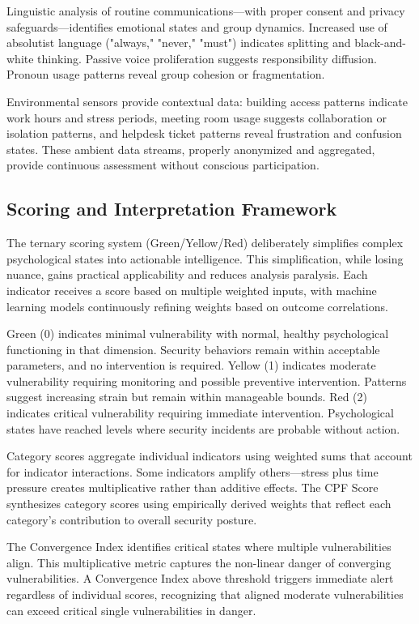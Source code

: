 \documentclass[11pt,a4paper]{article}
\begin{document}
Linguistic analysis of routine communications—with proper consent and privacy safeguards—identifies emotional states and group dynamics. Increased use of absolutist language ("always," "never," "must") indicates splitting and black-and-white thinking. Passive voice proliferation suggests responsibility diffusion. Pronoun usage patterns reveal group cohesion or fragmentation.

Environmental sensors provide contextual data: building access patterns indicate work hours and stress periods, meeting room usage suggests collaboration or isolation patterns, and helpdesk ticket patterns reveal frustration and confusion states. These ambient data streams, properly anonymized and aggregated, provide continuous assessment without conscious participation.

\subsection{Scoring and Interpretation Framework}

The ternary scoring system (Green/Yellow/Red) deliberately simplifies complex psychological states into actionable intelligence. This simplification, while losing nuance, gains practical applicability and reduces analysis paralysis. Each indicator receives a score based on multiple weighted inputs, with machine learning models continuously refining weights based on outcome correlations.

Green (0) indicates minimal vulnerability with normal, healthy psychological functioning in that dimension. Security behaviors remain within acceptable parameters, and no intervention is required. Yellow (1) indicates moderate vulnerability requiring monitoring and possible preventive intervention. Patterns suggest increasing strain but remain within manageable bounds. Red (2) indicates critical vulnerability requiring immediate intervention. Psychological states have reached levels where security incidents are probable without action.

Category scores aggregate individual indicators using weighted sums that account for indicator interactions. Some indicators amplify others—stress plus time pressure creates multiplicative rather than additive effects. The CPF Score synthesizes category scores using empirically derived weights that reflect each category's contribution to overall security posture.

The Convergence Index identifies critical states where multiple vulnerabilities align. This multiplicative metric captures the non-linear danger of converging vulnerabilities. A Convergence Index above threshold triggers immediate alert regardless of individual scores, recognizing that aligned moderate vulnerabilities can exceed critical single vulnerabilities in danger.
\end{document}
